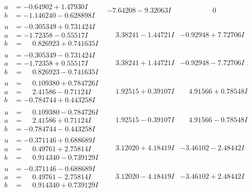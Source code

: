 \documentclass[1p]{elsarticle_modified}
\theoremstyle{definition}
\begin{document}
$$\begin{array}{c|c|c}
\begin{aligned}
a &= -0.64902 + 1.47930 I \\
b &= -1.146240 - 0.628898 I\end{aligned}
 & -7.64208 - 9.32063 I & \phantom{-0.000000 } 0 \\ \hline\begin{aligned}
u &= -0.305349 + 0.731424 I \\
a &= -1.72358 - 0.55517 I \\
b &= \phantom{-}0.826923 + 0.741635 I\end{aligned}
 & \phantom{-}3.38241 - 1.44721 I & -0.92948 + 7.72706 I \\ \hline\begin{aligned}
u &= -0.305349 - 0.731424 I \\
a &= -1.72358 + 0.55517 I \\
b &= \phantom{-}0.826923 - 0.741635 I\end{aligned}
 & \phantom{-}3.38241 + 1.44721 I & -0.92948 - 7.72706 I \\ \hline\begin{aligned}
u &= \phantom{-}0.109380 + 0.784726 I \\
a &= \phantom{-}2.41586 - 0.71124 I \\
b &= -0.784744 + 0.443258 I\end{aligned}
 & \phantom{-}1.92515 + 0.39107 I & \phantom{-}4.91566 + 0.78548 I \\ \hline\begin{aligned}
u &= \phantom{-}0.109380 - 0.784726 I \\
a &= \phantom{-}2.41586 + 0.71124 I \\
b &= -0.784744 - 0.443258 I\end{aligned}
 & \phantom{-}1.92515 - 0.39107 I & \phantom{-}4.91566 - 0.78548 I \\ \hline\begin{aligned}
u &= -0.371146 + 0.688689 I \\
a &= \phantom{-}0.49761 + 2.75814 I \\
b &= \phantom{-}0.914340 - 0.739129 I\end{aligned}
 & \phantom{-}3.12020 + 4.18419 I & -3.46102 - 2.48442 I \\ \hline\begin{aligned}
u &= -0.371146 - 0.688689 I \\
a &= \phantom{-}0.49761 - 2.75814 I \\
b &= \phantom{-}0.914340 + 0.739129 I\end{aligned}
 & \phantom{-}3.12020 - 4.18419 I & -3.46102 + 2.48442 I \\ \hline\begin{aligned}

\end{aligned}
\end{array}$$
\end{document}

